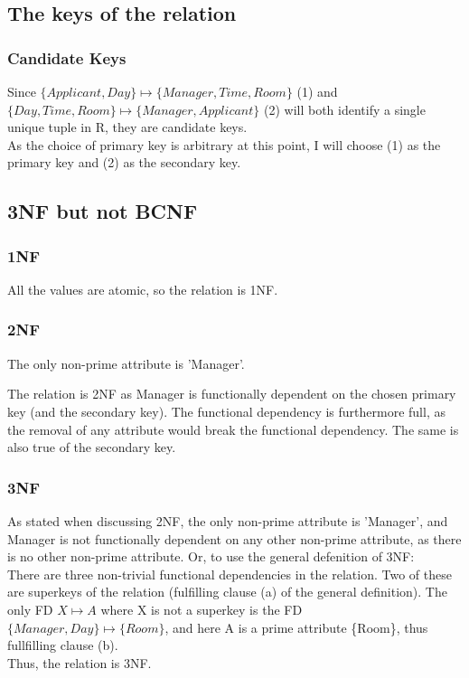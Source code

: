 \documentclass[12pt]{article}
\begin{document}
\subsection {The keys of the relation}\label{subsec:the-keys-of-the-relation}

\subsubsection {Candidate Keys}

Since \(\{Applicant, Day\} \mapsto \{Manager, Time, Room\}\) (1) and \(\{Day, Time, Room\} \mapsto \{Manager, Applicant\}\) (2) will both identify a single unique tuple in R, they are candidate keys. \\
As the choice of primary key is arbitrary at this point, I will choose (1) as the primary key and (2) as the secondary key.

\subsection {3NF but not BCNF}\label{subsec:3nf-but-not-bcnf}
\subsubsection {1NF}

All the values are atomic, so the relation is 1NF\@.

\subsubsection {2NF}

The only non-prime attribute is 'Manager'.

The relation is 2NF as Manager is functionally dependent on the chosen primary key (and the secondary key).
The functional dependency is furthermore full, as the removal of any attribute would break the functional dependency.
The same is also true of the secondary key.

\subsubsection {3NF}

As stated when discussing 2NF, the only non-prime attribute is 'Manager', and Manager is not functionally dependent on any other non-prime attribute, as there is no other non-prime attribute.
Or, to use the general defenition of 3NF:\\
There are three non-trivial functional dependencies in the relation.
Two of these are superkeys of the relation (fulfilling clause (a) of the general definition).
The only FD \(X \mapsto A\) where X is not a superkey is the FD \(\{Manager, Day\} \mapsto \{Room\}\), and here A is a prime attribute \{Room\}, thus fullfilling clause (b).
\\Thus, the relation is 3NF\@.
\end{document}
